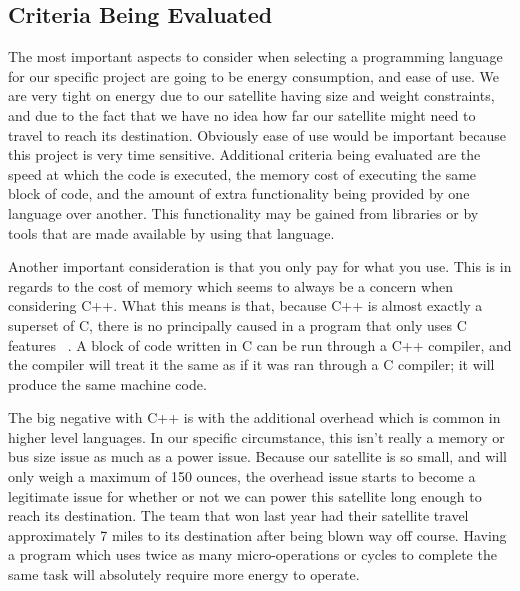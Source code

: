 \documentclass[10pt,letterpaper,onecolumn,journal]{IEEEtran}
\begin{document}
\subsection{Criteria Being Evaluated}
The most important aspects to consider when selecting a programming language for our specific project are going to be energy consumption, and ease of use. We are very tight on energy due to our satellite having size and weight constraints, and due to the fact that we have no idea how far our satellite might need to travel to reach its destination. Obviously ease of use would be important because this project is very time sensitive. Additional criteria being evaluated are the speed at which the code is executed, the memory cost of executing the same block of code, and the amount of extra functionality being provided by one language over another. This functionality may be gained from libraries or by tools that are made available by using that language.  
\vspace{.3cm}
\par
Another important consideration is that you only pay for what you use. This is in regards to the cost of memory which seems to always be a concern when considering C++. What this means is that, because C++ is almost exactly a superset of C, there is no principally caused in a program that only uses C features ~\cite{2015}. A block of code written in C can be run through a C++ compiler, and the compiler will treat it the same as if it was ran through a C compiler; it will produce the same machine code.
\vspace{.3cm}
\par
The big negative with C++ is with the additional overhead which is common in higher level languages. In our specific circumstance, this isn’t really a memory or bus size issue as much as a power issue. Because our satellite is so small, and will only weigh a maximum of 150 ounces, the overhead issue starts to become a legitimate issue for whether or not we can power this satellite long enough to reach its destination. The team that won last year had their satellite travel approximately 7 miles to its destination after being blown way off course. Having a program which uses twice as many micro-operations or cycles to complete the same task will absolutely require more energy to operate.
\end{document}
